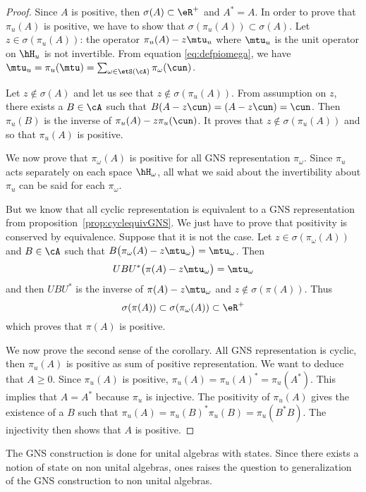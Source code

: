 \begin{proof}
	Since $A$ is positive, then $\sigma(A)\subset\eR^+$ and $A^*=A$. In order to prove that $\pi_u(A)$ is positive, we have to show that $\sigma(\pi_u(A))\subset\sigma(A)$. Let $z\in\sigma(\pi_u(A))$: the operator $\pi_u(A)-z\mtu_u$ where $\mtu_u$ is the unit operator on $\hH_u$ is not invertible. From equation  \eqref{eq:defpiomega},  we have $\mtu_u=\pi_u(\mtu)=\sum_{\omega\in\etS(\cA)}\pi_{\omega}(\cun)$.

	Let $z\notin\sigma(A)$ and let us see that $z\notin\sigma(\pi_u(A))$. From assumption on $z$, there exists a $B\in\cA$ such that $B(A-z\cun)=(A-z\cun)=\cun$. Then $\pi_u(B)$ is the inverse of $\pi_u(A)-z\pi_u(\cun)$. It proves that $z\notin\sigma(\pi_u(A))$ and so that $\pi_u(A)$ is positive.

	We now prove that $\pi_{\omega}(A)$ is positive for all GNS representation $\pi_{\omega}$. Since $\pi_u$ acts separately on each space $\hH_{\omega}$, all what we said about the invertibility about $\pi_u$ can be said for each $\pi_{\omega}$.

	But we know that all cyclic representation is equivalent to a GNS representation from proposition~\ref{prop:cyclequivGNS}. We just have to prove that positivity is conserved by equivalence. Suppose that it is not the case. Let $z\in\sigma(\pi_{\omega}(A))$ and $B\in\cA$ such that $B\big( \pi_{\omega}(A)-z\mtu_{\omega} \big)=\mtu_{\omega}$. Then
	\[
		UBU^*\big( \pi(A)-z\mtu_{\omega} \big)=\mtu_{\omega}
	\]
	and then $UBU^*$ is the inverse of $\pi(A)-z\mtu_{\omega}$ and $z\notin\sigma(\pi(A))$. Thus
	\[
		\sigma(\pi(A))\subset\sigma(\pi_{\omega}(A))\subset\eR^+
	\]
	which proves that $\pi(A)$ is positive.

	We now prove the second sense of the corollary. All GNS representation is cyclic, then $\pi_u(A)$ is positive as sum of positive representation. We want to deduce that $A\geq0$. Since $\pi_u(A)$ is positive, $\pi_u(A)=\pi_u(A)^*=\pi_u(A^*)$. This implies that $A=A^*$ because $\pi_u$ is injective. The positivity of $\pi_u(A)$ gives the existence of a $B$ such that  $\pi_u(A)=\pi_u(B)^*\pi_u(B)=\pi_u(B^*B)$. The injectivity then shows that $A$ is positive.

\end{proof}

The GNS construction is done for unital algebras with states. Since there exists a notion of state on non unital algebras, ones raises the question to generalization of the GNS construction to non unital algebras.

